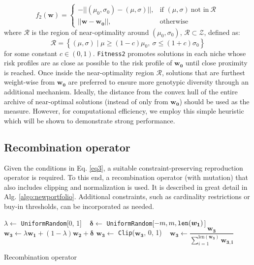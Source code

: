 \begin{equation}
    f_2(\boldsymbol{w})= 
\begin{cases}
    -||(\mu_0, \sigma_0)-(\mu, \sigma)||,& \text{if } (\mu, \sigma) \ \text{not in}\ \mathcal{R} \ \\
    ||\boldsymbol{w}-\boldsymbol{w_0}||,              & \text{otherwise}
\end{cases}
\end{equation}
where $\mathcal{R}$ is the region of near-optimality around $(\mu_0, \sigma_0)$, $\mathcal{R} \subset \mathcal{Z}$, defined as:
\begin{equation}
    \mathcal{R} = \left\{(\mu, \sigma) \mid \mu \geq (1-c) \mu_0, \ \sigma \leq (1+c) \sigma_0 \right\}
\label{eq2}
\end{equation}
for some constant $c \in (0, 1) $. \verb|Fitness2| promotes solutions in each niche whose risk profiles are as close as possible to the risk profile of $\boldsymbol{w_0}$ until close proximity is reached. Once inside the near-optimality region $\mathcal{R}$, solutions that are furthest weight-wise from $\boldsymbol{w_0}$ are preferred to ensure more genotypic diversity through an additional mechanism. Ideally, the distance from the convex hull of the entire archive of near-optimal solutions (instead of only from $\boldsymbol{w_0}$) should be used as the measure. However, for computational efficiency, we employ this simple heuristic which will be shown to demonstrate strong performance. 
\subsection{Recombination operator}

Given the conditions in Eq. \ref{eq3}, a suitable constraint-preserving reproduction operator is required. To this end, a recombination operator (with mutation) that also includes clipping and normalization is used. It is described in great detail in Alg. \ref{algo:newportfolio}. Additional constraints, such as cardinality restrictions or buy-in thresholds, can be incorporated as needed.


\begin{algorithm}[t!]
\SetAlgoLined
{}
$\lambda \gets$ \verb|UniformRandom|[0, 1] \ 
$\boldsymbol{\delta} \gets$ \verb|UniformRandom|[$-m, m, \verb|len|(\boldsymbol{w_1})$] \ 
$\boldsymbol{w_3} \gets \lambda \boldsymbol{w_{1}} + (1 - \lambda) \boldsymbol{w_{2}} + \boldsymbol{\delta}$ 
$\boldsymbol{w_3} \gets$ \verb|Clip|($\boldsymbol{w_3}$, 0, 1) \ 
$\boldsymbol{w_3} \gets \dfrac{\boldsymbol{w_3}}{\sum_{i=1}^{\text{len}(\boldsymbol{w_3})} \boldsymbol{w_{3,i}}}$ \ 
\caption{Recombination operator}
\label{algo:newportfolio}
\end{algorithm}

